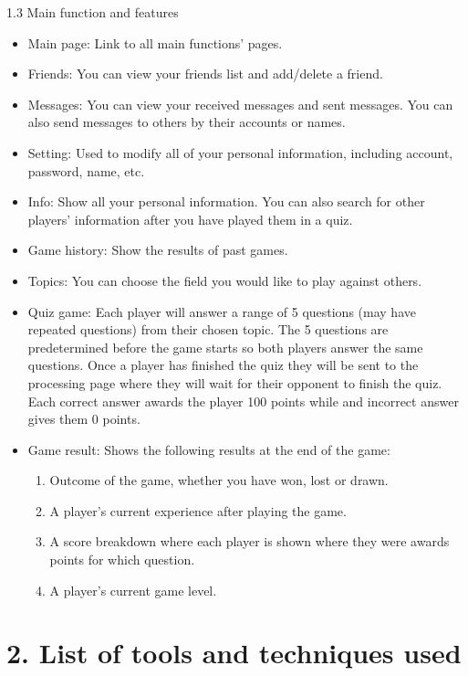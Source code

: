 \documentclass{article}
\begin{document}
1.3	Main function and features
\begin{itemize}
\item Main page: Link to all main functions’ pages.
\item Friends: You can view your friends list and add/delete a friend. 
\item Messages: You can view your received messages and sent messages. You can also send messages to others by their accounts or names. 
\item Setting: Used to modify all of your personal information, including account, password, name, etc. 
\item Info: Show all your personal information. You can also search for other players’ information after you have played them in a quiz. 
\item Game history: Show the results of past games. 
\item Topics: You can choose the field you would like to play against others. 
\item Quiz game: Each player will answer a range of 5 questions (may have repeated questions) from their chosen topic. The 5 questions are predetermined before the game starts so both players answer the same questions. Once a player has finished the quiz they will be sent to the processing page where they will wait for their opponent to finish the quiz. Each correct answer awards the player 100 points while and incorrect answer gives them 0 points.
\item Game result: Shows the following results at the end of the game:
\begin{enumerate}
\item Outcome of the game, whether you have won, lost or drawn.
\item A player’s current experience after playing the game.
\item A score breakdown where each player is shown where they were awards points for which question. 
\item A player’s current game level.

\end{enumerate}

\end{itemize}


\section{2. List of tools and techniques used}
\end{document}
